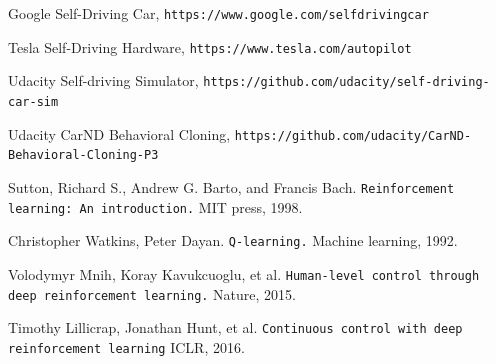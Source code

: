 \documentclass[a4paper]{article}
\begin{document}


\begin{thebibliography}{9}
  Google Self-Driving Car, \texttt{https://www.google.com/selfdrivingcar}

  Tesla Self-Driving Hardware, \texttt{https://www.tesla.com/autopilot}

  Udacity Self-driving Simulator, \texttt{https://github.com/udacity/self-driving-car-sim}

  Udacity CarND Behavioral Cloning, \texttt{https://github.com/udacity/CarND-Behavioral-Cloning-P3}

    Sutton, Richard S., Andrew G. Barto, and Francis Bach. \texttt{Reinforcement learning: An
    introduction.} MIT press, 1998.
    
  Christopher Watkins,  Peter Dayan. \texttt{Q-learning.} Machine learning, 1992.
  
  Volodymyr Mnih, Koray Kavukcuoglu, et al. \texttt{Human-level control through deep
  reinforcement learning.} Nature, 2015.
  
   Timothy Lillicrap, Jonathan Hunt, et al. \texttt{Continuous control with deep reinforcement learning} ICLR, 2016.

\end{thebibliography}
\end{document}
